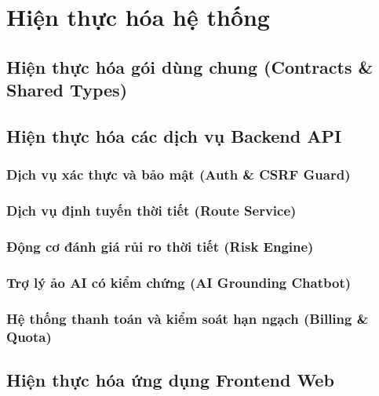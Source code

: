 \chapter{Hiện thực hóa hệ thống}
\label{ch:implementation}

\section{Hiện thực hóa gói dùng chung (Contracts \& Shared Types)}

\section{Hiện thực hóa các dịch vụ Backend API}
\subsection{Dịch vụ xác thực và bảo mật (Auth \& CSRF Guard)}

\subsection{Dịch vụ định tuyến thời tiết (Route Service)}

\subsection{Động cơ đánh giá rủi ro thời tiết (Risk Engine)}

\subsection{Trợ lý ảo AI có kiểm chứng (AI Grounding Chatbot)}

\subsection{Hệ thống thanh toán và kiểm soát hạn ngạch (Billing \& Quota)}

\section{Hiện thực hóa ứng dụng Frontend Web}
